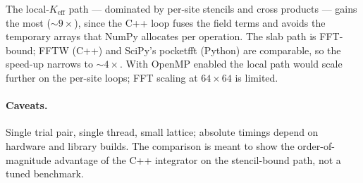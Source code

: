 \documentclass[11pt,a4paper]{article}
\begin{document}
The local-$K_{\text{eff}}$ path --- dominated by per-site stencils and
cross products --- gains the most ($\sim 9\times$), since the C++ loop
fuses the field terms and avoids the temporary arrays that NumPy
allocates per operation. The slab path is FFT-bound; FFTW (C++) and
SciPy's pocketfft (Python) are comparable, so the speed-up narrows to
$\sim 4\times$. With OpenMP enabled the local path would scale further
on the per-site loops; FFT scaling at $64\times64$ is limited.

\paragraph{Caveats.} Single trial pair, single thread, small lattice;
absolute timings depend on hardware and library builds. The comparison
is meant to show the order-of-magnitude advantage of the C++
integrator on the stencil-bound path, not a tuned benchmark.
\end{document}
